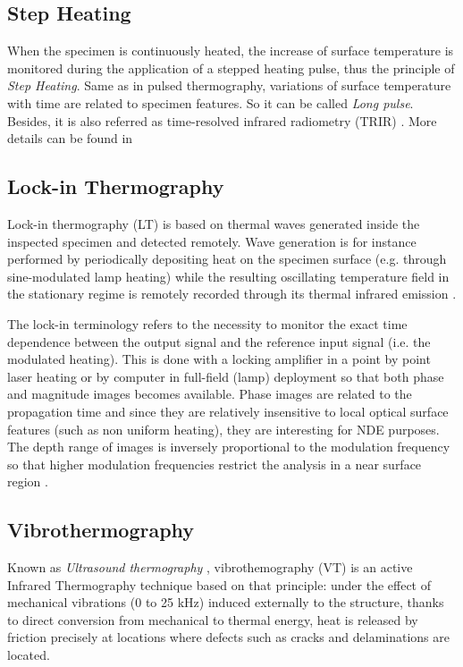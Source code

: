 \subsection{Step Heating}
When the specimen is  continuously heated, the increase of surface temperature is monitored during the application of a stepped heating pulse, thus the principle of \textit{Step Heating}. Same as in pulsed thermography, variations of surface temperature with time are related to specimen features. So it can be called \textit{Long pulse}. Besides, it is also referred as  time-resolved  infrared radiometry (TRIR) \citep{spicer1992time}.  More details can be found in \citep{ibarra2013infrared,osiander1998thermal}

\subsection{Lock-in Thermography}
Lock-in thermography (LT) is based on thermal waves generated inside the inspected specimen and detected remotely. Wave generation is for instance performed by periodically depositing heat on the specimen surface (e.g. through sine-modulated lamp heating) while the resulting oscillating temperature field in the stationary regime is remotely recorded through its thermal infrared emission \citep{wu1998lock}.

The lock-in terminology refers to the necessity to monitor the exact time dependence between the output signal and the reference input signal (i.e. the modulated heating). This is done with a locking amplifier in a point by point laser heating or by computer in full-field (lamp) deployment so that both phase and magnitude images becomes available. Phase images are related to the propagation time and since they are relatively insensitive to local optical surface features (such as non uniform heating), they are interesting for NDE purposes. The depth range of images is inversely proportional to the modulation frequency so that higher modulation frequencies restrict the analysis in a near surface region \citep{Maldague2001theory}.

\subsection{Vibrothermography}
Known as \textit{Ultrasound thermography} \citep{dillenz2001progress}, vibrothemography (VT) is an active Infrared Thermography technique based on that principle: under the effect of mechanical vibrations (0 to 25 kHz) induced externally to the structure, thanks to direct conversion from mechanical to thermal energy, heat is released by friction precisely at locations where defects such as cracks and delaminations are located.

